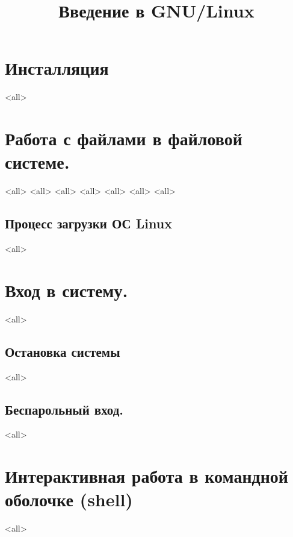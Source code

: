 

\title{Введение в GNU/Linux}




\begin{frame}
	\frametitle{}
	\titlepage
	\vspace{-0.5cm}
	\begin{center}
	\end{center}
\end{frame}


\begin{frame}
	\tableofcontents
	[hideallsubsections]
\end{frame}


\section{Инсталляция}
\mode<all>{}
\section{Работа с файлами в файловой системе.}
\mode<all>{}
\mode<all>{}
\mode<all>{}
\mode<all>{}
\mode<all>{}
\mode<all>{}
\mode<all>{}
\subsection{Процесс загрузки ОС Linux}
\mode<all>{}

\section{Вход в систему.}
\mode<all>{}
\subsection{Остановка системы}
\mode<all>{}

\subsection{Беспарольный вход.}
\mode<all>{}
\section{Интерактивная работа в командной оболочке (shell)}
\mode<all>{}

\bye
